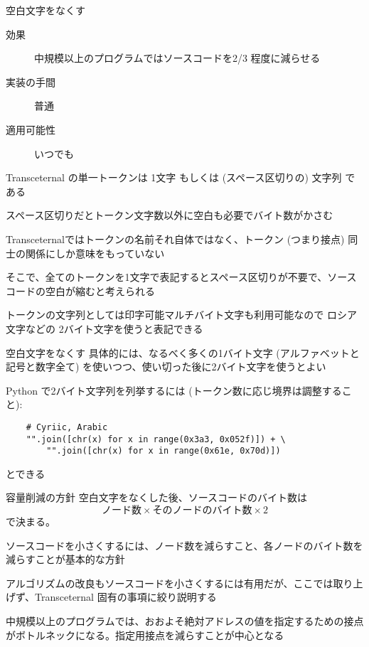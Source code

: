 \documentclass[12pt,unicode]{beamer}
\begin{document}
\begin{frame}[fragile]{空白文字をなくす}
   \begin{description}
      \item[効果] 中規模以上のプログラムではソースコードを2/3 程度に減らせる
      \item[実装の手間] 普通
      \item[適用可能性] いつでも
   \end{description}

   Transceternal の単一トークンは 1文字 もしくは (スペース区切りの) 文字列 である

   スペース区切りだとトークン文字数以外に空白も必要でバイト数がかさむ

   Transceternalではトークンの名前それ自体ではなく、トークン (つまり接点) 同士の関係にしか意味をもっていない

   そこで、全てのトークンを1文字で表記するとスペース区切りが不要で、ソースコードの空白が縮むと考えられる

   トークンの文字列としては印字可能マルチバイト文字も利用可能なので
   ロシア文字などの 2バイト文字を使うと表記できる

\end{frame}
\begin{frame}[fragile]{空白文字をなくす}
   具体的には、なるべく多くの1バイト文字 (アルファベットと記号と数字全て) を使いつつ、使い切った後に2バイト文字を使うとよい

   Python で2バイト文字列を列挙するには (トークン数に応じ境界は調整すること):

   \begin{verbatim}
    # Cyriic, Arabic
    "".join([chr(x) for x in range(0x3a3, 0x052f)]) + \
        "".join([chr(x) for x in range(0x61e, 0x70d)])
    \end{verbatim}

    とできる
\end{frame}

\begin{frame}{容量削減の方針}
   空白文字をなくした後、ソースコードのバイト数は 
   \[
      \text{ノード数} \times \text{そのノードのバイト数} \times 2
   \]
   で決まる。

   ソースコードを小さくするには、ノード数を減らすこと、各ノードのバイト数を減らすことが基本的な方針

   アルゴリズムの改良もソースコードを小さくするには有用だが、ここでは取り上げず、Transceternal 固有の事項に絞り説明する

   中規模以上のプログラムでは、おおよそ絶対アドレスの値を指定するための接点がボトルネックになる。指定用接点を減らすことが中心となる
\end{frame}
\end{document}
